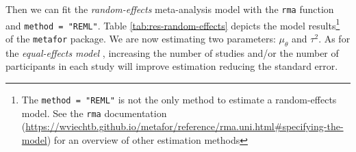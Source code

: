 \documentclass[
  man,floatsintext]{apa6}
\newenvironment{Shaded}{\begin{snugshade}}{\end{snugshade}}
\newcommand{\AttributeTok}[1]{\textcolor[rgb]{0.13,0.29,0.53}{#1}}
\newcommand{\CommentTok}[1]{\textcolor[rgb]{0.56,0.35,0.01}{\textit{#1}}}
\newcommand{\DecValTok}[1]{\textcolor[rgb]{0.00,0.00,0.81}{#1}}
\newcommand{\FloatTok}[1]{\textcolor[rgb]{0.00,0.00,0.81}{#1}}
\newcommand{\FunctionTok}[1]{\textcolor[rgb]{0.13,0.29,0.53}{\textbf{#1}}}
\newcommand{\NormalTok}[1]{#1}
\newcommand{\OtherTok}[1]{\textcolor[rgb]{0.56,0.35,0.01}{#1}}
\newcommand{\SpecialCharTok}[1]{\textcolor[rgb]{0.81,0.36,0.00}{\textbf{#1}}}
\newcommand{\StringTok}[1]{\textcolor[rgb]{0.31,0.60,0.02}{#1}}
\begin{document}
\begin{Shaded}
\end{Shaded}

\normalsize

Then we can fit the \emph{random-effects} meta-analysis model with the \texttt{rma} function and \texttt{method\ =\ "REML"}. Table \ref{tab:res-random-effects} depicts the model results\footnote{The \texttt{method\ =\ "REML"} is not the only method to estimate a random-effects model. See the \texttt{rma} documentation (\url{https://wviechtb.github.io/metafor/reference/rma.uni.html\#specifying-the-model}) for an overview of other estimation methods} of the \texttt{metafor} package. We are now estimating two parameters: \(\mu_{\theta}\) and \(\tau^{2}\). As for the \emph{equal-effects model} , increasing the number of studies and/or the number of participants in each study will improve estimation reducing the standard error.
\end{document}
